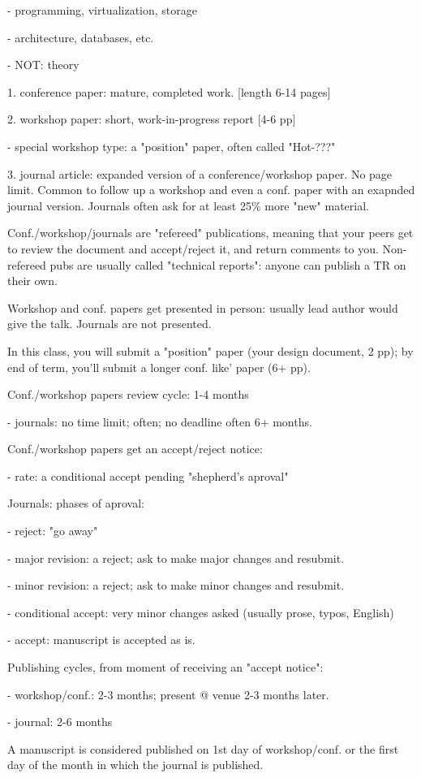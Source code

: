- programming, virtualization, storage

- architecture, databases, etc.

- NOT: theory

1. conference paper: mature, completed work. [length 6-14 pages]

2. workshop paper: short, work-in-progress report [4-6 pp]

- special workshop type: a "position" paper, often called "Hot-???"

3. journal article: expanded version of a conference/workshop
   paper.  No page limit.  Common to follow up a workshop and even
   a conf. paper with an exapnded journal version. Journals often
   ask for at least 25\% more "new" material.

Conf./workshop/journals are "refereed" publications, meaning that
your peers get to review the document and accept/reject it, and
return comments to you.  Non-refereed pubs are usually called
"technical reports": anyone can publish a TR on their own.

Workshop and conf. papers get presented in person: usually lead
author would give the talk.  Journals are not presented.

In this class, you will submit a "position" paper (your design
document, 2 pp); by end of term, you'll submit a longer conf. like'
paper (6+ pp).

Conf./workshop papers review cycle: 1-4 months

- journals: no time limit; often; no deadline often 6+ months.

Conf./workshop papers get an accept/reject notice:

- rate: a conditional accept pending "shepherd's aproval"

Journals: phases of aproval:

- reject: "go away"

- major revision: a reject; ask to make major changes and resubmit.

- minor revision: a reject; ask to make minor changes and resubmit.

- conditional accept: very minor changes asked (usually prose,
  typos, English)

- accept: manuscript is accepted as is.

Publishing cycles, from moment of receiving an "accept notice":

- workshop/conf.: 2-3 months; present @ venue 2-3 months later.

- journal: 2-6 months

A manuscript is considered published on 1st day of workshop/conf.
or the first day of the month in which the journal is published.



